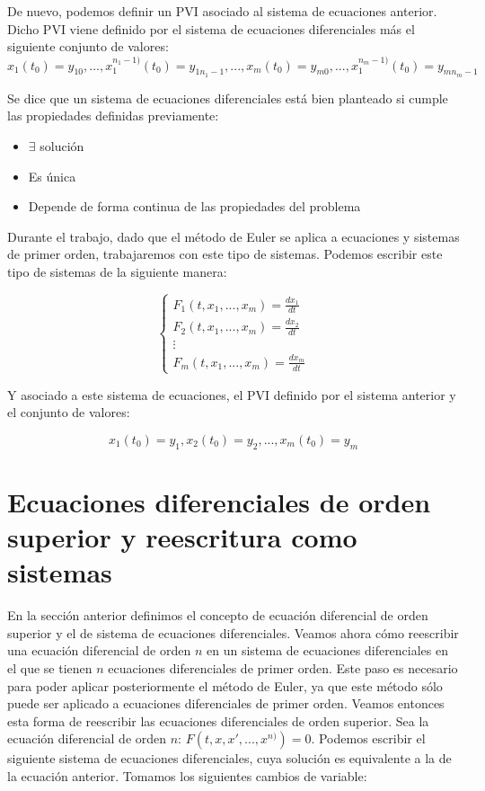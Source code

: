 \documentclass[12pt]{article}       %
\begin{document}
De nuevo, podemos definir un PVI asociado al sistema de ecuaciones anterior. Dicho PVI viene definido por el sistema de ecuaciones diferenciales más el siguiente conjunto de valores:
$$ x_1(t_0) = y_{10}, ..., x_1^{n_1-1)}(t_0) = y_{1n_1-1}, ..., x_m(t_0) = y_{m0}, ..., x_1^{n_m-1)}(t_0) = y_{mn_m-1} $$

Se dice que un sistema de ecuaciones diferenciales está bien planteado si cumple las propiedades definidas previamente:

\begin{itemize}
\item $\exists$ solución
\item Es única
\item Depende de forma continua de las propiedades del problema
\end{itemize}

Durante el trabajo, dado que el método de Euler se aplica a ecuaciones y sistemas de primer orden, trabajaremos con este tipo de sistemas. Podemos escribir este tipo de sistemas de la siguiente manera:

$$
\begin{cases}
F_1(t, x_1, ..., x_m) = \frac{d x_1}{d t} \\
F_2(t, x_1, ..., x_m) = \frac{d x_2}{d t} \\
\vdots \\
F_m(t, x_1, ..., x_m) = \frac{d x_m}{d t}
\end{cases}
$$

Y asociado a este sistema de ecuaciones, el PVI definido por el sistema anterior y el conjunto de valores:

$$ x_1(t_0) = y_1, x_2(t_0) = y_2, ..., x_m(t_0) = y_m $$

\section{Ecuaciones diferenciales de orden superior y reescritura como sistemas}

En la sección anterior definimos el concepto de ecuación diferencial de orden superior y el de sistema de ecuaciones diferenciales. Veamos ahora cómo reescribir una ecuación diferencial de orden $n$ en un sistema de ecuaciones diferenciales en el que se tienen $n$ ecuaciones diferenciales de primer orden. Este paso es necesario para poder aplicar posteriormente el método de Euler, ya que este método sólo puede ser aplicado a ecuaciones diferenciales de primer orden. Veamos entonces esta forma de reescribir las ecuaciones diferenciales de orden superior. Sea la ecuación diferencial de orden $n$: $ F(t, x, x', ..., x^{n)}) = 0 $. Podemos escribir el siguiente sistema de ecuaciones diferenciales, cuya solución es equivalente a la de la ecuación anterior. Tomamos los siguientes cambios de variable:
\end{document}
